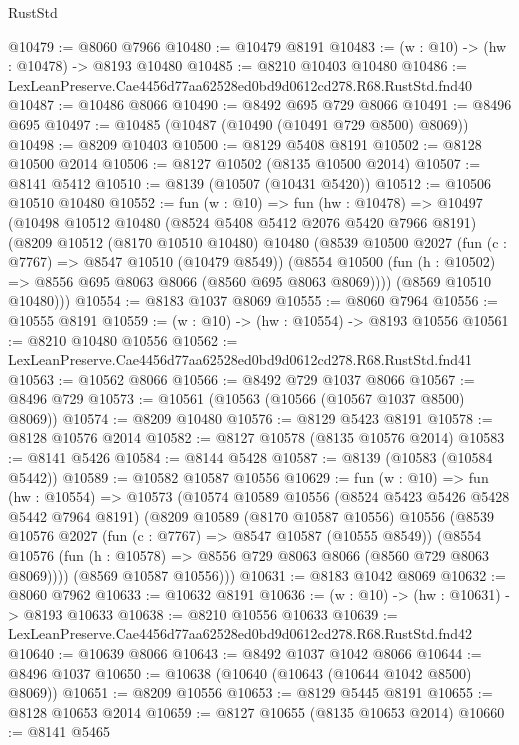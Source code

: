 \begin{lexlean}{RustStd}
\begin{coremodule}
@10479 := @8060 @7966
@10480 := @10479 @8191
@10483 := (w : @10) -> (hw : @10478) -> @8193 @10480
@10485 := @8210 @10403 @10480
@10486 := LexLeanPreserve.Cae4456d77aa62528ed0bd9d0612cd278.R68.RustStd.fnd40
@10487 := @10486 @8066
@10490 := @8492 @695 @729 @8066
@10491 := @8496 @695
@10497 := @10485 (@10487 (@10490 (@10491 @729 @8500) @8069))
@10498 := @8209 @10403
@10500 := @8129 @5408 @8191
@10502 := @8128 @10500 @2014
@10506 := @8127 @10502 (@8135 @10500 @2014)
@10507 := @8141 @5412
@10510 := @8139 (@10507 (@10431 @5420))
@10512 := @10506 @10510 @10480
@10552 := fun (w : @10) =>
  fun (hw : @10478) =>
  @10497
    (@10498
      @10512
      @10480
      (@8524 @5408 @5412 @2076 @5420 @7966 @8191)
      (@8209
        @10512
        (@8170 @10510 @10480)
        @10480
        (@8539
          @10500
          @2027
          (fun (c : @7767) => @8547 @10510 (@10479 @8549))
          (@8554 @10500 (fun (h : @10502) => @8556 @695 @8063 @8066 (@8560 @695 @8063 @8069))))
        (@8569 @10510 @10480)))
@10554 := @8183 @1037 @8069
@10555 := @8060 @7964
@10556 := @10555 @8191
@10559 := (w : @10) -> (hw : @10554) -> @8193 @10556
@10561 := @8210 @10480 @10556
@10562 := LexLeanPreserve.Cae4456d77aa62528ed0bd9d0612cd278.R68.RustStd.fnd41
@10563 := @10562 @8066
@10566 := @8492 @729 @1037 @8066
@10567 := @8496 @729
@10573 := @10561 (@10563 (@10566 (@10567 @1037 @8500) @8069))
@10574 := @8209 @10480
@10576 := @8129 @5423 @8191
@10578 := @8128 @10576 @2014
@10582 := @8127 @10578 (@8135 @10576 @2014)
@10583 := @8141 @5426
@10584 := @8144 @5428
@10587 := @8139 (@10583 (@10584 @5442))
@10589 := @10582 @10587 @10556
@10629 := fun (w : @10) =>
  fun (hw : @10554) =>
  @10573
    (@10574
      @10589
      @10556
      (@8524 @5423 @5426 @5428 @5442 @7964 @8191)
      (@8209
        @10589
        (@8170 @10587 @10556)
        @10556
        (@8539
          @10576
          @2027
          (fun (c : @7767) => @8547 @10587 (@10555 @8549))
          (@8554 @10576 (fun (h : @10578) => @8556 @729 @8063 @8066 (@8560 @729 @8063 @8069))))
        (@8569 @10587 @10556)))
@10631 := @8183 @1042 @8069
@10632 := @8060 @7962
@10633 := @10632 @8191
@10636 := (w : @10) -> (hw : @10631) -> @8193 @10633
@10638 := @8210 @10556 @10633
@10639 := LexLeanPreserve.Cae4456d77aa62528ed0bd9d0612cd278.R68.RustStd.fnd42
@10640 := @10639 @8066
@10643 := @8492 @1037 @1042 @8066
@10644 := @8496 @1037
@10650 := @10638 (@10640 (@10643 (@10644 @1042 @8500) @8069))
@10651 := @8209 @10556
@10653 := @8129 @5445 @8191
@10655 := @8128 @10653 @2014
@10659 := @8127 @10655 (@8135 @10653 @2014)
@10660 := @8141 @5465

\end{coremodule}
\end{lexlean}
